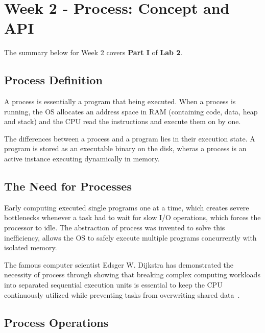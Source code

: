 \documentclass[conference]{IEEEtran}
\begin{document}
\section{Week 2 - Process: Concept and API}

\noindent The summary below for Week 2 covers \textbf{Part I} of \textbf{Lab 2}.

\subsection{Process Definition}

A process is essentially a program that being executed. When a process is running, the OS allocates
an address space in RAM (containing code, data, heap and stack) and the CPU read the instructions
and execute them on by one.

\hspace{5pt}

\noindent The differences between a process and a program lies in their execution state.
A program is stored as an executable binary on the disk, wheras a process is an active instance executing dynamically in memory.

\subsection{The Need for Processes}

Early computing executed single programs one at a time, which creates severe bottlenecks whenever a task had to wait for slow I/O operations, which forces the processor to idle. The 
abstraction of process was invented to solve this inefficiency, allows the OS to safely execute multiple programs concurrently with isolated memory.

\hspace{5pt}

\noindent The famous computer scientist Edsger W. Dijkstra has demonstrated the necessity of process through 
showing that breaking complex computing workloads into separated sequential execution units is essential to keep the CPU
continuously utilized while preventing tasks from overwriting shared data~\cite{dijkstra1968the}.

\subsection{Process Operations}
\end{document}
